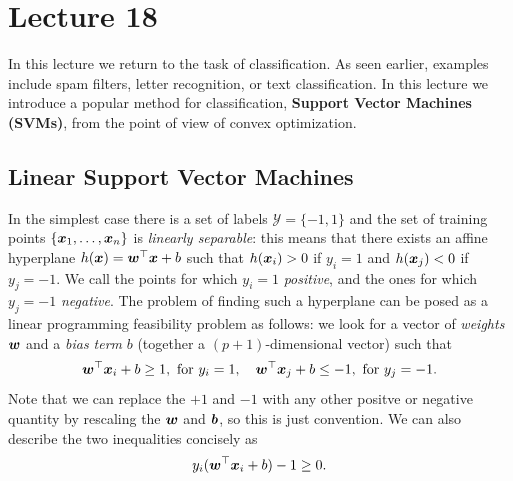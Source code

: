 %
%
% 


\chapter*{Lecture 18}
\addtocounter{chapter}{18}
\addtocounter{section}{0}

In this lecture we return to the task of classification. As seen earlier, examples include spam filters, letter recognition, or text classification. In this lecture we introduce a popular method for classification, \textbf{Support Vector Machines (SVMs)}, from the point of view of convex optimization.

\section{Linear Support Vector Machines}
In the simplest case there is a set of labels $\mathcal{Y}=\{-1,1\}$ and the set of training points $\{\bm{x}_1,\dots,\bm{x}_n\}$ is {\em linearly separable}: this means that there exists an affine hyperplane $h(\bm{x})=\bm{w}^{\top}\bm{x}+b$ such that $h(\bm{x}_i)>0$ if $y_i=1$ and $h(\bm{x}_j)<0$ if $y_j=-1$. We call the points for which $y_i=1$ {\em positive}, and the ones for which $y_j=-1$ {\em negative}.
The problem of finding such a hyperplane can be posed as a linear programming feasibility problem as follows: we look for a vector of {\em weights} $\bm{w}$ and a {\em bias term} $b$ (together a $(p+1)$-dimensional vector) such that 
\begin{equation*}
  \bm{w}^{\top}\bm{x}_i+b\geq 1, \text{ for } y_i=1, \quad \bm{w}^{\top}\bm{x}_j+b\leq -1, \text{ for } y_j=-1.
\end{equation*}
Note that we can replace the $+1$ and $-1$ with any other positve or negative quantity by rescaling the $\bm{w}$ and $\bm{b}$, so this is just convention. We can also describe the two inequalities concisely as
\begin{equation}\label{eq:sephyp}
  y_i(\bm{w}^{\top}\bm{x}_i+b)-1 \geq 0.
\end{equation}


